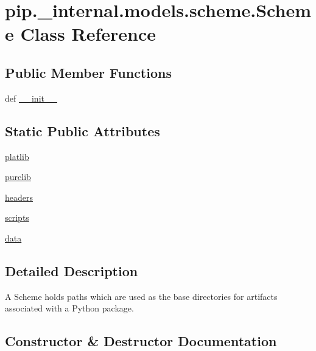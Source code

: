 \hypertarget{classpip_1_1__internal_1_1models_1_1scheme_1_1Scheme}{}\section{pip.\+\_\+internal.\+models.\+scheme.\+Scheme Class Reference}
\label{classpip_1_1__internal_1_1models_1_1scheme_1_1Scheme}
\subsection*{Public Member Functions}
\begin{DoxyCompactItemize}
\item 
def \hyperlink{classpip_1_1__internal_1_1models_1_1scheme_1_1Scheme_aa38dcd17406d125ce2c31696261bee69}{\+\_\+\+\_\+init\+\_\+\+\_\+}
\end{DoxyCompactItemize}
\subsection*{Static Public Attributes}
\begin{DoxyCompactItemize}
\item 
\hyperlink{classpip_1_1__internal_1_1models_1_1scheme_1_1Scheme_a84c6e51a222d1b7c828af1e66377cadb}{platlib}
\item 
\hyperlink{classpip_1_1__internal_1_1models_1_1scheme_1_1Scheme_a7d065a35291a22b73cf07cd58490f5d2}{purelib}
\item 
\hyperlink{classpip_1_1__internal_1_1models_1_1scheme_1_1Scheme_a27cf1d79880a88eaeb6cdb86fda62092}{headers}
\item 
\hyperlink{classpip_1_1__internal_1_1models_1_1scheme_1_1Scheme_a40fb19a8d20789ee88d58098b4521ebd}{scripts}
\item 
\hyperlink{classpip_1_1__internal_1_1models_1_1scheme_1_1Scheme_aad598faf8a4ed903718b64199ab799b5}{data}
\end{DoxyCompactItemize}


\subsection{Detailed Description}
\begin{DoxyVerb}A Scheme holds paths which are used as the base directories for
artifacts associated with a Python package.
\end{DoxyVerb}
 

\subsection{Constructor \& Destructor Documentation}
\mbox{\label{classpip_1_1__internal_1_1models_1_1scheme_1_1Scheme_aa38dcd17406d125ce2c31696261bee69}} 
